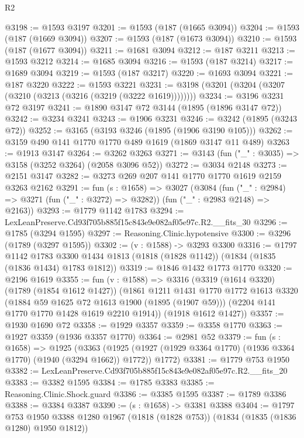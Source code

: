 \begin{lexlean}{R2}
\begin{coremodule}
@3198 := @1593 @3197
@3201 := @1593 (@187 (@1665 @3094))
@3204 := @1593 (@187 (@1669 @3094))
@3207 := @1593 (@187 (@1673 @3094))
@3210 := @1593 (@187 (@1677 @3094))
@3211 := @1681 @3094
@3212 := @187 @3211
@3213 := @1593 @3212
@3214 := @1685 @3094
@3216 := @1593 (@187 @3214)
@3217 := @1689 @3094
@3219 := @1593 (@187 @3217)
@3220 := @1693 @3094
@3221 := @187 @3220
@3222 := @1593 @3221
@3231 := @3198 (@3201 (@3204 (@3207 (@3210 (@3213 (@3216 (@3219 (@3222 @1619))))))))
@3234 := @3196 @3231 @72 @3197
@3241 := @1890 @3147 @72 @3144 (@1895 (@1896 @3147 @72))
@3242 := @3234 @3241
@3243 := @1906 @3231
@3246 := @3242 (@1895 (@3243 @72))
@3252 := @3165 (@3193 @3246 (@1895 (@1906 @3190 @105)))
@3262 := @3159 @490 @141 @1770 @1770 @489 @1619 (@1869 @3147 @11 @489)
@3263 := @1913 @3147
@3264 := @3262 @3263
@3271 := @3143 (fun ("_" : @3035) => @3158 (@3252 @3264) (@2058 @3096 @52))
@3272 := @3034 @2148
@3273 := @2151 @3147
@3282 := @3273 @269 @207 @141 @1770 @1770 @1619 @2159 @3263 @2162
@3291 := fun (s : @1658) =>
  @3027
    (@3084
      (fun ("_" : @2984) => @3271 (fun ("_" : @3272) => @3282))
      (fun ("_" : @2983 @2148) => @2163))
@3293 := @1779 @1142 @1783
@3294 := LexLeanPreserve.Cd93f705b885f15c843e9e082af05e97c.R2.__fits_30
@3296 := @1785 (@3294 @1595)
@3297 := Reasoning.Clinic.hypotensive
@3300 := @3296 (@1789 (@3297 @1595))
@3302 := (v : @1588) -> @3293 @3300
@3316 := @1797
    @1142
    @1783
    @3300
    @1434
    @1813
    (@1818 (@1828 @1142))
    (@1834 (@1835 (@1836 @1434) @1783 @1812))
@3319 := @1846 @1432 @1773 @1770
@3320 := @2196 @1619
@3355 := fun (v : @1588) =>
  @3316
    (@3319
      (@1614 @3320)
      (@1789 (@1854 @1612 @1427))
      (@1861
        @1211
        @1431
        @1770
        @1772
        @1613
        @3320
        (@1884 @59 @1625 @72 @1613 @1900 (@1895 (@1907 @59)))
        (@2204 @141 @1770 @1770 @1428 @1619 @2210 @1914))
      (@1918 @1612 @1427))
@3357 := @1930 @1690 @72
@3358 := @1929 @3357
@3359 := @3358 @1770
@3363 := @1927 @3359 (@1936 @3357 @1770)
@3364 := @2981 @52
@3379 := fun (s : @1658) =>
  @1925
    (@3363
      (@1925 (@1927 (@1929 @3364 @1770) (@1936 @3364 @1770) (@1940 (@3294 @1662)) @1772))
      @1772)
@3381 := @1779 @753 @1950
@3382 := LexLeanPreserve.Cd93f705b885f15c843e9e082af05e97c.R2.__fits_20
@3383 := @3382 @1595
@3384 := @1785 @3383
@3385 := Reasoning.Clinic.Shock.guard
@3386 := @3385 @1595
@3387 := @1789 @3386
@3388 := @3384 @3387
@3390 := (s : @1658) -> @3381 @3388
@3404 := @1797
    @753
    @1950
    @3388
    @1280
    @1967
    (@1818 (@1828 @753))
    (@1834 (@1835 (@1836 @1280) @1950 @1812))

\end{coremodule}
\end{lexlean}
